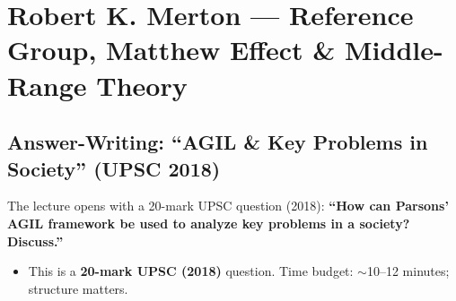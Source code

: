 \section{Robert K. Merton --- Reference Group, Matthew Effect \& Middle-Range Theory}

\subsection{Answer-Writing: ``AGIL \& Key Problems in Society'' (UPSC 2018)}

The lecture opens with a 20-mark UPSC question (2018): \textbf{``How can Parsons' AGIL framework be used to analyze key problems in a society? Discuss.''}

\begin{PYQLink}
\begin{itemize}
\item This is a \textbf{20-mark UPSC (2018)} question. Time budget: $\sim$10--12 minutes; structure matters.
\end{itemize}
\end{PYQLink}

